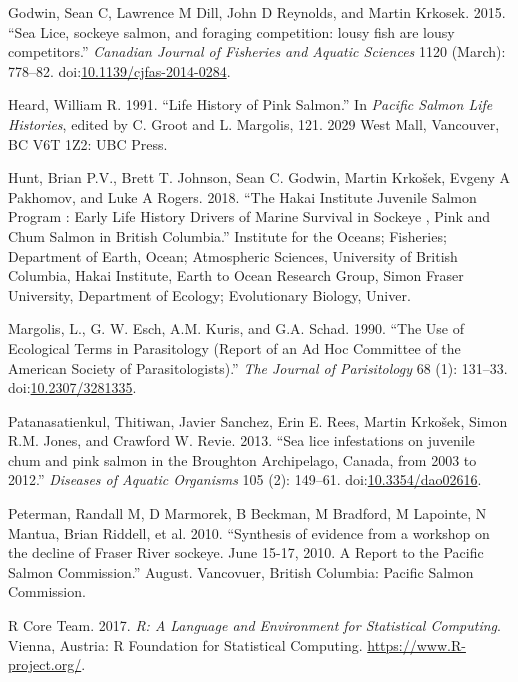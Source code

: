 \documentclass[fleqn,10pt]{wlpeerj} %
\begin{document}
\hypertarget{ref-Godwin2015}{}
Godwin, Sean C, Lawrence M Dill, John D Reynolds, and Martin Krkosek.
2015. ``Sea Lice, sockeye salmon, and foraging competition: lousy fish
are lousy competitors.'' \emph{Canadian Journal of Fisheries and Aquatic
Sciences} 1120 (March): 778--82.
doi:\href{https://doi.org/10.1139/cjfas-2014-0284}{10.1139/cjfas-2014-0284}.

\hypertarget{ref-Heard1991}{}
Heard, William R. 1991. ``Life History of Pink Salmon.'' In
\emph{Pacific Salmon Life Histories}, edited by C. Groot and L.
Margolis, 121. 2029 West Mall, Vancouver, BC V6T 1Z2: UBC Press.

\hypertarget{ref-Hunt2018}{}
Hunt, Brian P.V., Brett T. Johnson, Sean C. Godwin, Martin Krkošek,
Evgeny A Pakhomov, and Luke A Rogers. 2018. ``The Hakai Institute
Juvenile Salmon Program : Early Life History Drivers of Marine Survival
in Sockeye , Pink and Chum Salmon in British Columbia.'' Institute for
the Oceans; Fisheries; Department of Earth, Ocean; Atmospheric Sciences,
University of British Columbia, Hakai Institute, Earth to Ocean Research
Group, Simon Fraser University, Department of Ecology; Evolutionary
Biology, Univer.

\hypertarget{ref-Margolis1990}{}
Margolis, L., G. W. Esch, A.M. Kuris, and G.A. Schad. 1990. ``The Use of
Ecological Terms in Parasitology (Report of an Ad Hoc Committee of the
American Society of Parasitologists).'' \emph{The Journal of
Parisitology} 68 (1): 131--33.
doi:\href{https://doi.org/10.2307/3281335}{10.2307/3281335}.

\hypertarget{ref-Patanasatienkul2013}{}
Patanasatienkul, Thitiwan, Javier Sanchez, Erin E. Rees, Martin Krkošek,
Simon R.M. Jones, and Crawford W. Revie. 2013. ``Sea lice infestations
on juvenile chum and pink salmon in the Broughton Archipelago, Canada,
from 2003 to 2012.'' \emph{Diseases of Aquatic Organisms} 105 (2):
149--61. doi:\href{https://doi.org/10.3354/dao02616}{10.3354/dao02616}.

\hypertarget{ref-Peterman2010}{}
Peterman, Randall M, D Marmorek, B Beckman, M Bradford, M Lapointe, N
Mantua, Brian Riddell, et al. 2010. ``Synthesis of evidence from a
workshop on the decline of Fraser River sockeye. June 15-17, 2010. A
Report to the Pacific Salmon Commission.'' August. Vancovuer, British
Columbia: Pacific Salmon Commission.

\hypertarget{ref-R}{}
R Core Team. 2017. \emph{R: A Language and Environment for Statistical
Computing}. Vienna, Austria: R Foundation for Statistical Computing.
\url{https://www.R-project.org/}.
\end{document}
